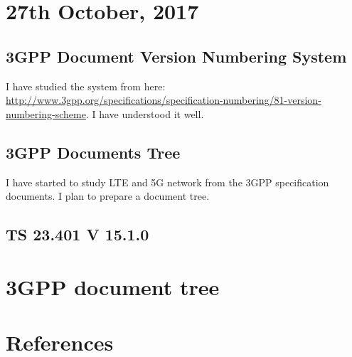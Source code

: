 \documentclass[14pt]{article}
\begin{document}

\section*{27th October, 2017}                           

\subsection*{3GPP Document Version Numbering System}
I have studied the system from here: \url{http://www.3gpp.org/specifications/specification-numbering/81-version-numbering-scheme}. I have understood it well.

\subsection*{3GPP Documents Tree}
I have started to study LTE and 5G network from the 3GPP specification documents. I plan to prepare a document tree.

\subsection*{TS 23.401 V 15.1.0}


\section*{3GPP document tree}



\section{References}
\end{document}
